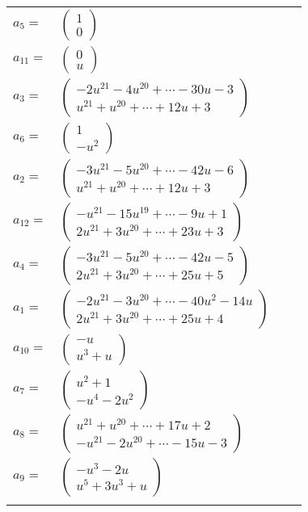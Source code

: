 \documentclass[1p]{elsarticle_modified}
\theoremstyle{definition}
\begin{document}
\begin{tabular}{m{7pt} m{180pt} m{7pt} m{180pt} }
\flushright $a_{5}=$&$\begin{pmatrix}1\\0\end{pmatrix}$ \\
\flushright $a_{11}=$&$\begin{pmatrix}0\\u\end{pmatrix}$ \\
\flushright $a_{3}=$&$\begin{pmatrix}-2 u^{21}-4 u^{20}+\cdots-30 u-3\\u^{21}+u^{20}+\cdots+12 u+3\end{pmatrix}$ \\
\flushright $a_{6}=$&$\begin{pmatrix}1\\- u^2\end{pmatrix}$ \\
\flushright $a_{2}=$&$\begin{pmatrix}-3 u^{21}-5 u^{20}+\cdots-42 u-6\\u^{21}+u^{20}+\cdots+12 u+3\end{pmatrix}$ \\
\flushright $a_{12}=$&$\begin{pmatrix}- u^{21}-15 u^{19}+\cdots-9 u+1\\2 u^{21}+3 u^{20}+\cdots+23 u+3\end{pmatrix}$ \\
\flushright $a_{4}=$&$\begin{pmatrix}-3 u^{21}-5 u^{20}+\cdots-42 u-5\\2 u^{21}+3 u^{20}+\cdots+25 u+5\end{pmatrix}$ \\
\flushright $a_{1}=$&$\begin{pmatrix}-2 u^{21}-3 u^{20}+\cdots-40 u^2-14 u\\2 u^{21}+3 u^{20}+\cdots+25 u+4\end{pmatrix}$ \\
\flushright $a_{10}=$&$\begin{pmatrix}- u\\u^3+u\end{pmatrix}$ \\
\flushright $a_{7}=$&$\begin{pmatrix}u^2+1\\- u^4-2 u^2\end{pmatrix}$ \\
\flushright $a_{8}=$&$\begin{pmatrix}u^{21}+u^{20}+\cdots+17 u+2\\- u^{21}-2 u^{20}+\cdots-15 u-3\end{pmatrix}$ \\
\flushright $a_{9}=$&$\begin{pmatrix}- u^3-2 u\\u^5+3 u^3+u\end{pmatrix}$\\&\end{tabular}
\end{document}
